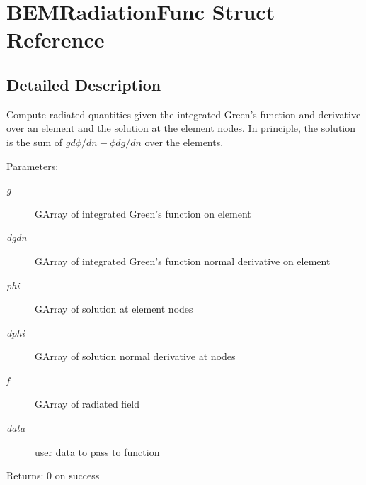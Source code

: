 \section{BEMRadiationFunc Struct Reference}
\label{structBEMRadiationFunc}


\subsection{Detailed Description}
Compute radiated quantities given the integrated Green's function and derivative over an element and the solution at the element nodes. In principle, the solution is the sum of $g{d\phi}/{d n}-\phi dg/dn$ over the elements.

\begin{Desc}
\item[Parameters:]
\begin{description}
\item[{\em g}]GArray of integrated Green's function on element \item[{\em dgdn}]GArray of integrated Green's function normal derivative on element \item[{\em phi}]GArray of solution at element nodes \item[{\em dphi}]GArray of solution normal derivative at nodes \item[{\em f}]GArray of radiated field \item[{\em data}]user data to pass to function\end{description}
\end{Desc}
\begin{Desc}
\item[Returns:]0 on success \end{Desc}


